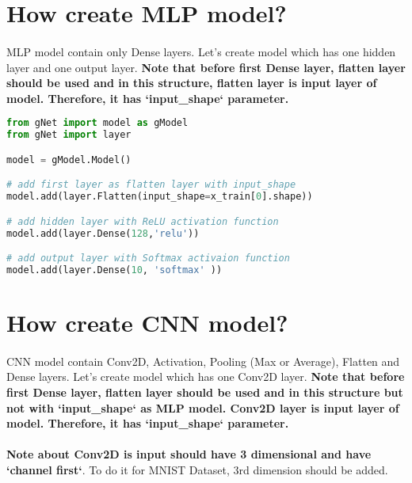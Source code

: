 \documentclass[12pt]{report}
\begin{document}
\section{How create MLP model?}
\paragraph{}
MLP model contain only Dense layers. Let's create model which has one hidden layer and one output layer. \textbf{Note that before first Dense layer, flatten layer should be used and in this structure, flatten layer is input layer of model. Therefore, it has `input\_shape` parameter.}


\begin{lstlisting}[language=Python, numbers=none, caption={Create MLP model.}, label={ex:create-mlp-model}]
from gNet import model as gModel
from gNet import layer

model = gModel.Model()

# add first layer as flatten layer with input_shape
model.add(layer.Flatten(input_shape=x_train[0].shape))

# add hidden layer with ReLU activation function
model.add(layer.Dense(128,'relu'))

# add output layer with Softmax activaion function 
model.add(layer.Dense(10, 'softmax' ))
\end{lstlisting}



\section{How create CNN model?}
\paragraph{}
CNN model contain Conv2D, Activation, Pooling (Max or Average), Flatten and Dense layers. Let's create model which has one Conv2D layer. \textbf{Note that before first Dense layer, flatten layer should be used and in this structure but not with `input\_shape` as MLP model. Conv2D layer is input layer of model. Therefore, it has `input\_shape` parameter.}

\paragraph{}
\textbf{Note about Conv2D is input should have 3 dimensional and have `channel first`}. To do it for MNIST Dataset, 3rd dimension should be added.
\end{document}
